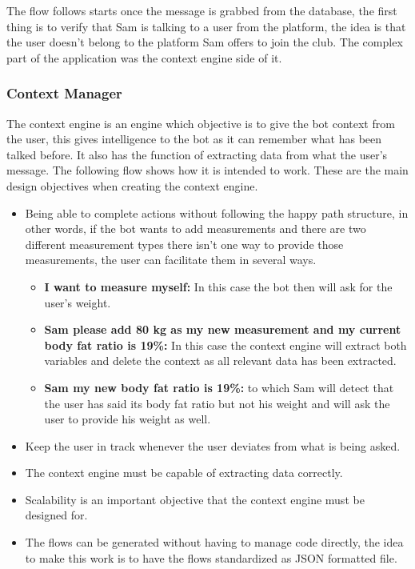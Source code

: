 The flow follows starts once the message is grabbed from the database, the first thing is to verify that Sam is talking to a user from the platform, the idea is that the user doesn’t belong to the platform Sam offers to join the club. The complex part of the application was the context engine side of it.

\subsubsection{Context Manager}\label{sec:chap4_ori_cont_man}

The context engine is an engine which objective is to give the bot context from the user, this gives intelligence to the bot as it can remember what has been talked before. It also has the function of extracting data from what the user’s message. The following flow shows how it is intended to work. These are the main design objectives when creating the context engine.
\begin{itemize}
	\item{Being able to complete actions without following the happy path structure, in other words, if the bot wants to add measurements and there are two different measurement types there isn’t one way to provide those measurements, the user can facilitate them in several ways.
	\begin{itemize}
		\item{\textbf{I want to measure myself:} In this case the bot then will ask for the user’s weight.}
		\item{\textbf{Sam please add 80 kg as my new measurement and my current body fat ratio is 19\%:} In this case the context engine will extract both variables and delete the context as all relevant data has been extracted.}
		\item{\textbf{Sam my new body fat ratio is 19\%:} to which Sam will detect that the user has said its body fat ratio but not his weight and will ask the user to provide his weight as well.}
	\end{itemize}
	}
	\item{Keep the user in track whenever the user deviates from what is being asked.}
	\item{The context engine must be capable of extracting data correctly.}
	\item{Scalability is an important objective that the context engine must be designed for.}
	\item{The flows can be generated without having to manage code directly, the idea to make this work is to have the flows standardized as JSON formatted file. }
\end{itemize}

